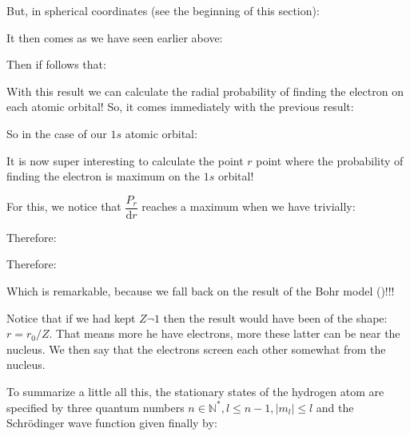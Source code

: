 	But, in spherical coordinates (see the beginning of this section):
	
	It then comes as we have seen earlier above:
	
	Then if follows that:
	
	With this result we can calculate the radial probability of finding the electron on each atomic orbital! So, it comes immediately with the previous result:
	
	So in the case of our $1s$ atomic orbital:
	
	It is now super interesting to calculate the point $r$ point where the probability of finding the electron is maximum on the $1s$ orbital!

	For this, we notice that $\dfrac{P_r}{\mathrm{d}r}$ reaches a maximum when we have trivially:
	
	Therefore:
	
	Therefore:
	
	Which is remarkable, because we fall back on the result of the Bohr model ()!!!
	
	\begin{tcolorbox}[title=Remark,colframe=black,arc=10pt]
	Notice that if we had kept $Z\neg 1$ then the result would have been of the shape: $r=r_0/Z$. That means more he have electrons, more these latter can be near the nucleus. We then say that the electrons screen each other somewhat from the nucleus.\label{electron screening}
	\end{tcolorbox}

	To summarize a little all this, the stationary states of the hydrogen atom are specified by three quantum numbers $n\in\mathbb{N}^{*},l\leq n-1,|m_l|\leq l$ and the Schrödinger wave function given finally by:
	
